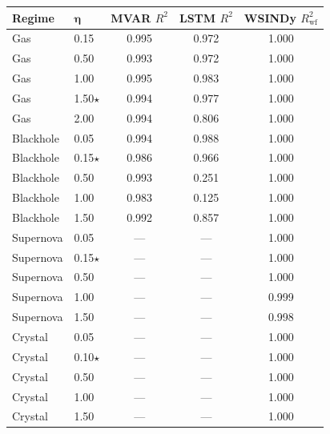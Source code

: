 \begin{tabular}{llccc}
\toprule
\textbf{Regime} & $\boldsymbol{\eta}$ & \textbf{MVAR} $R^2$ & \textbf{LSTM} $R^2$ & \textbf{WSINDy} $R^2_{\mathrm{wf}}$ \\
\midrule
Gas & 0.15 & 0.995 & 0.972 & 1.000 \\
Gas & 0.50 & 0.993 & 0.972 & 1.000 \\
Gas & 1.00 & 0.995 & 0.983 & 1.000 \\
Gas & 1.50$\star$ & 0.994 & 0.977 & 1.000 \\
Gas & 2.00 & 0.994 & 0.806 & 1.000 \\
\midrule
Blackhole & 0.05 & 0.994 & 0.988 & 1.000 \\
Blackhole & 0.15$\star$ & 0.986 & 0.966 & 1.000 \\
Blackhole & 0.50 & 0.993 & 0.251 & 1.000 \\
Blackhole & 1.00 & 0.983 & 0.125 & 1.000 \\
Blackhole & 1.50 & 0.992 & 0.857 & 1.000 \\
\midrule
Supernova & 0.05 & --- & --- & 1.000 \\
Supernova & 0.15$\star$ & --- & --- & 1.000 \\
Supernova & 0.50 & --- & --- & 1.000 \\
Supernova & 1.00 & --- & --- & 0.999 \\
Supernova & 1.50 & --- & --- & 0.998 \\
\midrule
Crystal & 0.05 & --- & --- & 1.000 \\
Crystal & 0.10$\star$ & --- & --- & 1.000 \\
Crystal & 0.50 & --- & --- & 1.000 \\
Crystal & 1.00 & --- & --- & 1.000 \\
Crystal & 1.50 & --- & --- & 1.000 \\
\bottomrule
\end{tabular}
